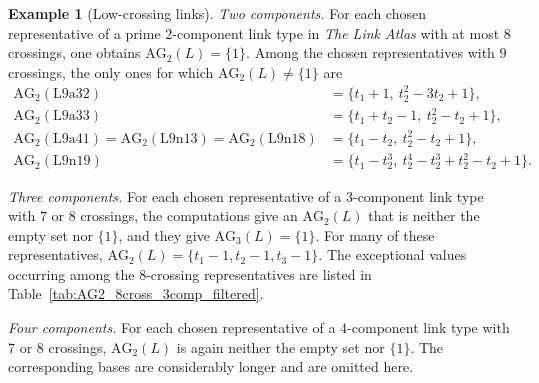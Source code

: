 \documentclass{article}
\theoremstyle{definition}
\newtheorem{example}[definition]{Example}
\theoremstyle{plain}
\newcommand{\AG}{\mathrm{AG}}
\begin{document}
\begin{example}[Low-crossing links]\label{ex:k2}
\noindent\emph{Two components.}
For each chosen representative of a prime \(2\)-component link type in
\emph{The Link Atlas} with at most \(8\) crossings, one obtains
\(\AG_2(L)=\{1\}\). Among the chosen representatives with \(9\) crossings,
the only ones for which \(\AG_2(L)\ne\{1\}\) are
\begin{align*}
\AG_2(\mathrm{L9a32})
  &=\{t_1+1,\ t_2^2-3t_2+1\},\\
\AG_2(\mathrm{L9a33})
  &=\{t_1+t_2-1,\ t_2^2-t_2+1\},\\
\AG_2(\mathrm{L9a41})
 =\AG_2(\mathrm{L9n13})
 =\AG_2(\mathrm{L9n18})
  &=\{t_1-t_2,\ t_2^2-t_2+1\},\\
\AG_2(\mathrm{L9n19})
  &=\{t_1-t_2^3,\ t_2^4-t_2^3+t_2^2-t_2+1\}.
\end{align*}

\smallskip
\noindent\emph{Three components.}
For each chosen representative of a \(3\)-component link type with \(7\) or
\(8\) crossings, the computations give an \(\AG_2(L)\) that is neither the
empty set nor \(\{1\}\), and they give \(\AG_3(L)=\{1\}\). For many of these
representatives,
\(\AG_2(L)=\{t_1-1,t_2-1,t_3-1\}\). The exceptional values occurring among
the \(8\)-crossing representatives are listed in
Table~\ref{tab:AG2_8cross_3comp_filtered}.

\smallskip
\noindent\emph{Four components.}
For each chosen representative of a \(4\)-component link type with \(7\) or
\(8\) crossings, \(\AG_2(L)\) is again neither the empty set nor \(\{1\}\).
The corresponding bases are considerably longer and are omitted here.
\end{example}
\end{document}
